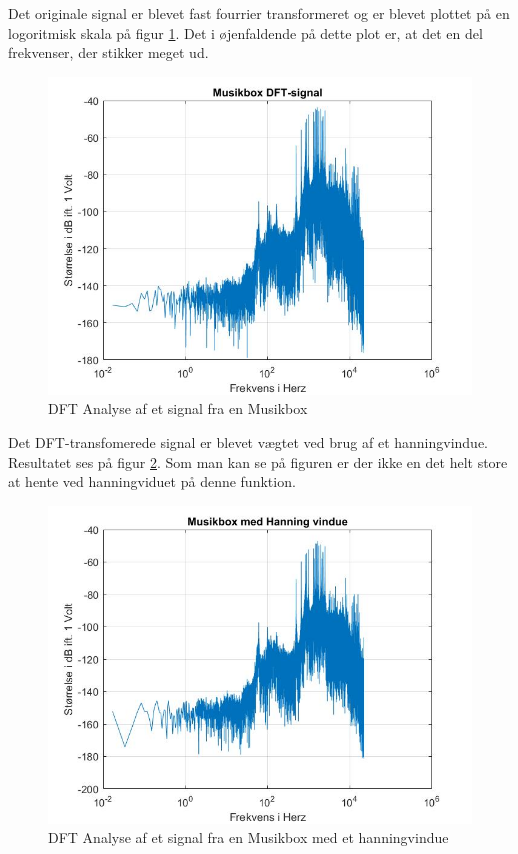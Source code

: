 Det originale signal er blevet fast fourrier transformeret og er blevet plottet på en logoritmisk skala på figur \ref{fig:Musikbox DFT}. Det i øjenfaldende på dette plot er, at det en del frekvenser, der stikker meget ud.
\begin{figure}[H]
	\centering
	\includegraphics[width=140mm]{figures/Musikbox/DFT.jpg}
	\caption{DFT Analyse af et signal fra en Musikbox}
	\label{fig:Musikbox DFT}
\end{figure}

Det DFT-transfomerede signal er blevet vægtet ved brug af et hanningvindue. Resultatet ses på figur \ref{fig:Musikbox hanning}. Som man kan se på figuren er der ikke en det helt store at hente ved hanningviduet på denne funktion.
\begin{figure}[H]
	\centering
	\includegraphics[width=140mm]{figures/Musikbox/hanning.jpg}
	\caption{DFT Analyse af et signal fra en Musikbox med et hanningvindue}
	\label{fig:Musikbox hanning}
\end{figure}

